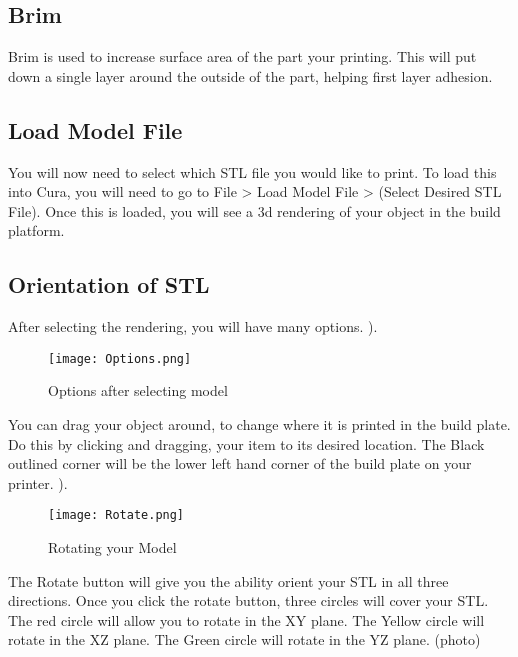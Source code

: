 \subsection{Brim}

Brim is used to increase surface area of the part your printing. This will put down a single layer around the outside of the part, helping first layer adhesion.

\subsection{Load Model File}

You will now need to select which STL file you would like to print. To load this into Cura, you will need to go to File > Load Model File > (Select Desired STL File). Once this is loaded, you will see a 3d rendering of your object in the build platform. 

\subsection{Orientation of STL}

After selecting the rendering, you will have many options. 
\pageref{fig:Options}).
\begin{figure}[hbt]
\centering
\texttt{[image: Options.png]}
\caption{Options after selecting model}
\label{fig:Orientation}
\end{figure}

You can drag your object around, to change where it is printed in the build plate. Do this by clicking and dragging, your item to its desired location. The Black outlined corner will be the lower left hand corner of the build plate on your printer. 
\pageref{fig:Rotating}).
\begin{figure}[hbt]
\centering
\texttt{[image: Rotate.png]}
\caption{Rotating your Model}
\label{fig:Rotating your Model}
\end{figure}

The Rotate button will give you the ability orient your STL in all three directions. Once you click the rotate button, three circles will cover your STL. The red circle will allow you to rotate in the XY plane. The Yellow circle will rotate in the XZ plane. The Green circle will rotate in the YZ plane. (photo)

